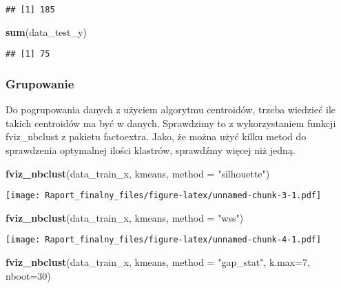 \documentclass[
]{article}
\newenvironment{Shaded}{\begin{snugshade}}{\end{snugshade}}
\newcommand{\DataTypeTok}[1]{\textcolor[rgb]{0.13,0.29,0.53}{#1}}
\newcommand{\DecValTok}[1]{\textcolor[rgb]{0.00,0.00,0.81}{#1}}
\newcommand{\KeywordTok}[1]{\textcolor[rgb]{0.13,0.29,0.53}{\textbf{#1}}}
\newcommand{\NormalTok}[1]{#1}
\newcommand{\StringTok}[1]{\textcolor[rgb]{0.31,0.60,0.02}{#1}}
\begin{document}
\begin{verbatim}
## [1] 185
\end{verbatim}

\begin{Shaded}
\begin{Highlighting}[]
\KeywordTok{sum}\NormalTok{(data_test_y)}
\end{Highlighting}
\end{Shaded}

\begin{verbatim}
## [1] 75
\end{verbatim}

\hypertarget{grupowanie}{%
\subsubsection{Grupowanie}\label{grupowanie}}

Do pogrupowania danych z użyciem algorytmu centroidów, trzeba wiedzieć
ile takich centroidów ma być w danych. Sprawdzimy to z wykorzystaniem
funkcji fviz\_nbclust z pakietu factoextra. Jako, że można użyć kilku
metod do sprawdzenia optymalnej ilości klastrów, sprawdźmy więcej niż
jedną.

\begin{Shaded}
\begin{Highlighting}[]
\KeywordTok{fviz_nbclust}\NormalTok{(data_train_x, kmeans, }\DataTypeTok{method =} \StringTok{"silhouette"}\NormalTok{)}
\end{Highlighting}
\end{Shaded}

\texttt{[image: Raport\_finalny\_files/figure-latex/unnamed-chunk-3-1.pdf]}

\begin{Shaded}
\begin{Highlighting}[]
\KeywordTok{fviz_nbclust}\NormalTok{(data_train_x, kmeans, }\DataTypeTok{method =} \StringTok{"wss"}\NormalTok{)}
\end{Highlighting}
\end{Shaded}

\texttt{[image: Raport\_finalny\_files/figure-latex/unnamed-chunk-4-1.pdf]}

\begin{Shaded}
\begin{Highlighting}[]
\KeywordTok{fviz_nbclust}\NormalTok{(data_train_x, kmeans, }\DataTypeTok{method =} \StringTok{"gap_stat"}\NormalTok{, }\DataTypeTok{k.max=}\DecValTok{7}\NormalTok{, }\DataTypeTok{nboot=}\DecValTok{30}\NormalTok{)}
\end{Highlighting}
\end{Shaded}
\end{document}
